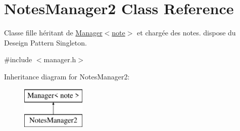 \hypertarget{class_notes_manager2}{}\section{Notes\+Manager2 Class Reference}
\label{class_notes_manager2}


Classe fille héritant de \hyperlink{class_manager}{Manager$<$note$>$} et chargée des notes. dispose du Deseign Pattern Singleton.  




{\ttfamily \#include $<$manager.\+h$>$}

Inheritance diagram for Notes\+Manager2\+:\begin{figure}[H]
\begin{center}
\leavevmode
\includegraphics[height=2.000000cm]{class_notes_manager2}
\end{center}
\end{figure}
